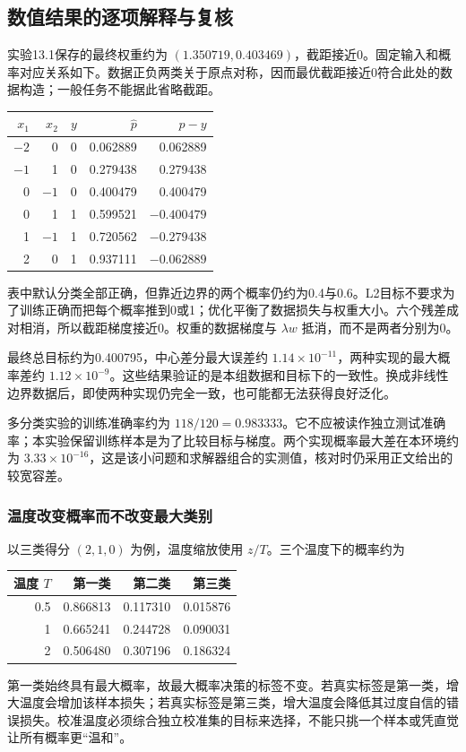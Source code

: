 \documentclass[UTF8,fontset=none,zihao=-4,a4paper]{ctexart}
\numberwithin{equation}{section}
\numberwithin{figure}{section}
\begin{document}
\subsection{数值结果的逐项解释与复核}
实验13.1保存的最终权重约为 $(1.350719,0.403469)$，截距接近0。固定输入和概率对应关系如下。数据正负两类关于原点对称，因而最优截距接近0符合此处的数据构造；一般任务不能据此省略截距。
\begin{center}
\begin{tabular}{rrrrr}
\toprule
$x_1$ & $x_2$ & $y$ & $\widehat p$ & $\widehat p-y$\\\midrule
$-2$ & 0 & 0 & 0.062889 & 0.062889\\
$-1$ & 1 & 0 & 0.279438 & 0.279438\\
0 & $-1$ & 0 & 0.400479 & 0.400479\\
0 & 1 & 1 & 0.599521 & $-0.400479$\\
1 & $-1$ & 1 & 0.720562 & $-0.279438$\\
2 & 0 & 1 & 0.937111 & $-0.062889$\\\bottomrule
\end{tabular}
\end{center}
表中默认分类全部正确，但靠近边界的两个概率仍约为0.4与0.6。L2目标不要求为了训练正确而把每个概率推到0或1；优化平衡了数据损失与权重大小。六个残差成对相消，所以截距梯度接近0。权重的数据梯度与 $\lambda w$ 抵消，而不是两者分别为0。

最终总目标约为0.400795，中心差分最大误差约 $1.14\times10^{-11}$，两种实现的最大概率差约 $1.12\times10^{-9}$。这些结果验证的是本组数据和目标下的一致性。换成非线性边界数据后，即使两种实现仍完全一致，也可能都无法获得良好泛化。

多分类实验的训练准确率约为 $118/120=0.983333$。它不应被读作独立测试准确率；本实验保留训练样本是为了比较目标与梯度。两个实现概率最大差在本环境约为 $3.33\times10^{-16}$，这是该小问题和求解器组合的实测值，核对时仍采用正文给出的较宽容差。

\subsubsection{温度改变概率而不改变最大类别}
以三类得分 $(2,1,0)$ 为例，温度缩放使用 $z/T$。三个温度下的概率约为
\begin{center}
\begin{tabular}{rrrr}
\toprule
温度 $T$ & 第一类 & 第二类 & 第三类\\\midrule
0.5 & 0.866813 & 0.117310 & 0.015876\\
1 & 0.665241 & 0.244728 & 0.090031\\
2 & 0.506480 & 0.307196 & 0.186324\\\bottomrule
\end{tabular}
\end{center}
第一类始终具有最大概率，故最大概率决策的标签不变。若真实标签是第一类，增大温度会增加该样本损失；若真实标签是第三类，增大温度会降低其过度自信的错误损失。校准温度必须综合独立校准集的目标来选择，不能只挑一个样本或凭直觉让所有概率更“温和”。
\end{document}
